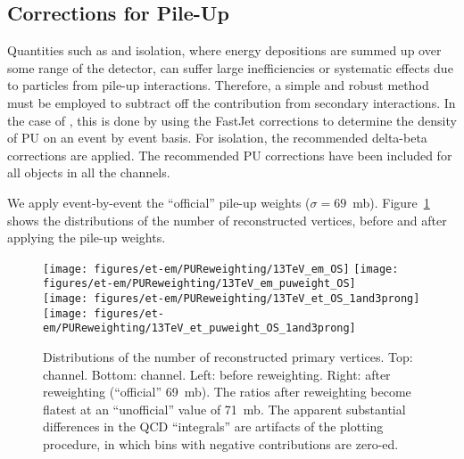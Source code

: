 \subsection{Corrections for Pile-Up}\label{ss:puvalidation}

Quantities such as \MET and isolation, where energy depositions are
summed up over some range of the detector, can suffer large
inefficiencies or systematic effects due to particles from pile-up
interactions. Therefore, a simple and robust method must be employed
to subtract off the contribution from secondary interactions.  In the
case of \MET, this is done by using the FastJet corrections to
determine the density of PU on an event by event basis. For isolation, the 
recommended delta-beta corrections are applied. The
recommended PU corrections have been included for all objects in all
the channels.




We apply event-by-event the ``official'' pile-up weights
($\sigma=69$~mb).  Figure~\ref{fig:nvtx} shows the distributions of
the number of reconstructed vertices, before and after applying the
pile-up weights.

\begin{figure}
  \centering
  \texttt{[image: figures/et-em/PUReweighting/13TeV\_em\_OS]}
  \texttt{[image: figures/et-em/PUReweighting/13TeV\_em\_puweight\_OS]} \\
  \texttt{[image: figures/et-em/PUReweighting/13TeV\_et\_OS\_1and3prong]}
  \texttt{[image: figures/et-em/PUReweighting/13TeV\_et\_puweight\_OS\_1and3prong]} \\
  \caption{\label{fig:nvtx} Distributions of the number of
    reconstructed primary vertices.  Top: \emu channel.  Bottom: \etau
    channel.  Left: before reweighting.  Right: after reweighting
    (``official'' 69~mb).  The ratios after reweighting become flatest
    at an ``unofficial'' value of 71~mb.  The apparent substantial
    differences in the QCD ``integrals'' are artifacts of the plotting
    procedure, in which bins with negative contributions are zero-ed.}
\end{figure}

